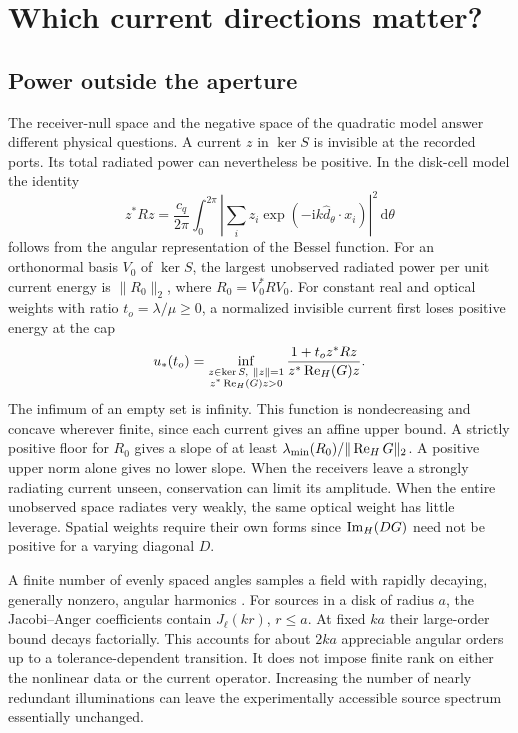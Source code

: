 \section{Which current directions matter?}\label{sec:physics}

\subsection{Power outside the aperture}

The receiver-null space and the negative space of the quadratic model answer different physical questions. A current $z$ in $\ker S$ is invisible at the recorded ports. Its total radiated power can nevertheless be positive. In the disk-cell model the identity
\begin{equation}
 z^*Rz=\frac{c_q}{2\pi}\int_0^{2\pi}
 \left|\sum_i z_i\exp(-\mathrm ik\widehat d_\theta\cdot x_i)\right|^2\,\mathrm d\theta
 \label{eq:rad}
\end{equation}
follows from the angular representation of the Bessel function. For an orthonormal basis $V_0$ of $\ker S$, the largest unobserved radiated power per unit current energy is $\|R_0\|_2$, where $R_0=V_0^*RV_0$. For constant real and optical weights with ratio $t_o=\lambda/\mu\ge0$, a normalized invisible current first loses positive energy at the cap
\begin{equation}
 u_*(t_o)=\inf_{\substack{z\in\ker S,\ \|z\|=1\\z^*\Herm(G)z>0}}
 \frac{1+t_o z^*Rz}{z^*\Herm(G)z}.
 \label{eq:dark}
\end{equation}
The infimum of an empty set is infinity. This function is nondecreasing and concave wherever finite, since each current gives an affine upper bound. A strictly positive floor for $R_0$ gives a slope of at least $\lambda_{\min}(R_0)/\|\operatorname{Re}_{H} G\|_2$. A positive upper norm alone gives no lower slope. When the receivers leave a strongly radiating current unseen, conservation can limit its amplitude. When the entire unobserved space radiates very weakly, the same optical weight has little leverage. Spatial weights require their own forms since $\operatorname{Im}_{H}(DG)$ need not be positive for a varying diagonal $D$.

A finite number of evenly spaced angles samples a field with rapidly decaying, generally nonzero, angular harmonics \cite{bucci87,bucci89}. For sources in a disk of radius $a$, the Jacobi--Anger coefficients contain $J_\ell(kr)$, $r\le a$. At fixed $ka$ their large-order bound decays factorially. This accounts for about $2ka$ appreciable angular orders up to a tolerance-dependent transition. It does not impose finite rank on either the nonlinear data or the current operator. Increasing the number of nearly redundant illuminations can leave the experimentally accessible source spectrum essentially unchanged.

